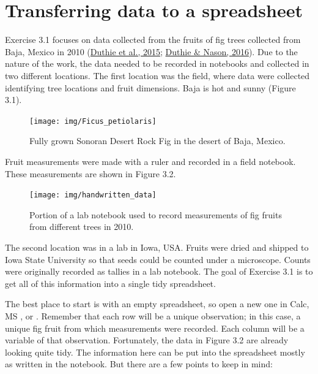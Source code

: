 \documentclass[
  openany]{krantz}
\begin{document}
\hypertarget{transferring-data-to-a-spreadsheet}{%
\section{Transferring data to a spreadsheet}\label{transferring-data-to-a-spreadsheet}}

Exercise 3.1 focuses on data collected from the fruits of fig trees collected from Baja, Mexico in 2010 (\protect\hyperlink{ref-Duthie2015b}{Duthie et al., 2015}; \protect\hyperlink{ref-Duthie2016}{Duthie \& Nason, 2016}).
Due to the nature of the work, the data needed to be recorded in notebooks and collected in two different locations.
The first location was the field, where data were collected identifying tree locations and fruit dimensions.
Baja is hot and sunny (Figure 3.1).

\begin{figure}
\texttt{[image: img/Ficus\_petiolaris]} \caption{Fully grown Sonoran Desert Rock Fig in the desert of Baja, Mexico.}\label{fig:unnamed-chunk-10}
\end{figure}

Fruit measurements were made with a ruler and recorded in a field notebook.
These measurements are shown in Figure 3.2.

\begin{figure}
\texttt{[image: img/handwritten\_data]} \caption{Portion of a lab notebook used to record measurements of fig fruits from different trees in 2010.}\label{fig:unnamed-chunk-11}
\end{figure}

The second location was in a lab in Iowa, USA.
Fruits were dried and shipped to Iowa State University so that seeds could be counted under a microscope.
Counts were originally recorded as tallies in a lab notebook.
The goal of Exercise 3.1 is to get all of this information into a single tidy spreadsheet.

The best place to start is with an empty spreadsheet, so open a new one in  Calc, MS , or .
Remember that each row will be a unique observation; in this case, a unique fig fruit from which measurements were recorded.
Each column will be a variable of that observation.
Fortunately, the data in Figure 3.2 are already looking quite tidy.
The information here can be put into the spreadsheet mostly as written in the notebook.
But there are a few points to keep in mind:
\end{document}
